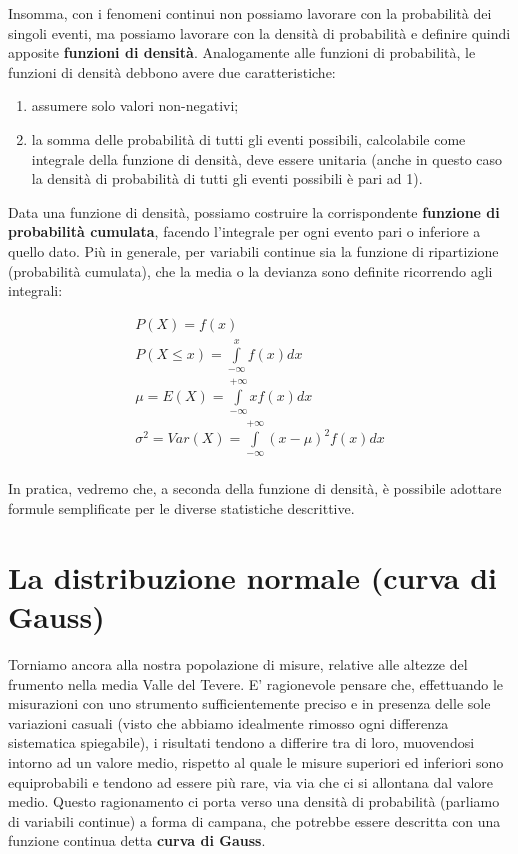 \documentclass[a4paper,12pt,oneside]{book}
\providecommand{\tightlist}{%
  \setlength{\itemsep}{0pt}\setlength{\parskip}{0pt}}
\theoremstyle{definition}
\theoremstyle{definition}
\theoremstyle{definition}
\theoremstyle{remark}
\begin{document}
Insomma, con i fenomeni continui non possiamo lavorare con la
probabilità dei singoli eventi, ma possiamo lavorare con la densità di
probabilità e definire quindi apposite \textbf{funzioni di densità}.
Analogamente alle funzioni di probabilità, le funzioni di densità
debbono avere due caratteristiche:

\begin{enumerate}
\def\labelenumi{\arabic{enumi}.}
\tightlist
\item
  assumere solo valori non-negativi;
\item
  la somma delle probabilità di tutti gli eventi possibili, calcolabile
  come integrale della funzione di densità, deve essere unitaria (anche
  in questo caso la densità di probabilità di tutti gli eventi possibili
  è pari ad 1).
\end{enumerate}

Data una funzione di densità, possiamo costruire la corrispondente
\textbf{funzione di probabilità cumulata}, facendo l'integrale per ogni
evento pari o inferiore a quello dato. Più in generale, per variabili
continue sia la funzione di ripartizione (probabilità cumulata), che la
media o la devianza sono definite ricorrendo agli integrali:

\[ \begin{array}{l}
P(X) = f(x) \\ 
P(X \le x) = \int\limits_{ - \infty }^x {f(x)} dx \\ 
\mu  = E(X) = \int\limits_{ - \infty }^{ + \infty } {xf(x)} dx \\ 
\sigma ^2  = Var(X) = \int\limits_{ - \infty }^{ + \infty } {\left( {x - \mu } \right)^2 f(x)} dx \\ 
\end{array} \]

In pratica, vedremo che, a seconda della funzione di densità, è
possibile adottare formule semplificate per le diverse statistiche
descrittive.

\section{La distribuzione normale (curva di
Gauss)}\label{la-distribuzione-normale-curva-di-gauss}

Torniamo ancora alla nostra popolazione di misure, relative alle altezze
del frumento nella media Valle del Tevere. E' ragionevole pensare che,
effettuando le misurazioni con uno strumento sufficientemente preciso e
in presenza delle sole variazioni casuali (visto che abbiamo idealmente
rimosso ogni differenza sistematica spiegabile), i risultati tendono a
differire tra di loro, muovendosi intorno ad un valore medio, rispetto
al quale le misure superiori ed inferiori sono equiprobabili e tendono
ad essere più rare, via via che ci si allontana dal valore medio. Questo
ragionamento ci porta verso una densità di probabilità (parliamo di
variabili continue) a forma di campana, che potrebbe essere descritta
con una funzione continua detta \textbf{curva di Gauss}.
\end{document}
